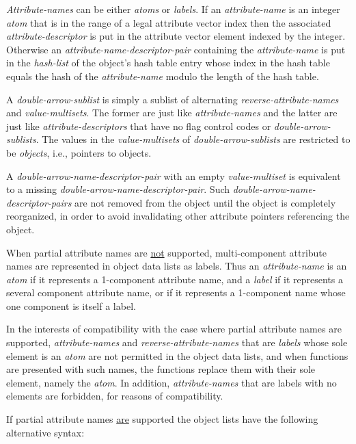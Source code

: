 \documentclass[12pt]{article}
\begin{document}
{\em Attribute-names} can be either {\em atoms} or {\em labels}.
If an {\em attribute-name} is an integer {\em atom}
that is in the range of a legal
attribute vector index then the associated
{\em attribute-descriptor} is put in the attribute vector element
indexed by the integer.
Otherwise an {\em attribute-name-descriptor-pair} containing
the {\em attribute-name} is put
in the {\em hash-list} of the object's hash table entry whose index
in the hash table
equals the hash of the {\em attribute-name} modulo the length of the
hash table.

A {\em double-arrow-sublist} is 
simply a sublist of alternating {\em reverse-attribute-names}
and {\em value-multisets}.  The former are just like {\em attribute-names}
and the latter are just like {\em attribute-descriptors} that have no
flag control codes or {\em double-arrow-sublists}.
The values in the {\em value-multisets} of {\em double-arrow-sublists}
are restricted to be {\em objects}, i.e., pointers to objects.

A {\em double-arrow-name-descriptor-pair} with an empty {\em value-multiset}
is equivalent to a missing {\em double-arrow-name-descriptor-pair}.
Such {\em dou\-ble-arrow-name-descriptor-pairs} are not
removed from the object until the object is completely reorganized,
in order to avoid invalidating other attribute pointers referencing the object.

When partial attribute names are \underline{not} supported, multi-component
attribute names are represented in object data lists as labels.
Thus an {\em attribute-name} is an {\em atom} if it represents a 1-component
attribute name, and a {\em label} if it represents a several component
attribute name, or if it represents a 1-component name whose one component
is itself a label.

In the interests of compatibility with the case where partial attribute
names are supported, {\em attribute-names} and {\em reverse-attribute-names}
that are {\em labels} whose sole element is an {\em atom} are not
permitted in the object data lists, and when functions are presented with
such names, the functions replace them with their sole element, namely the
{\em atom}.  In addition, {\em attribute-names} that are labels with no elements
are forbidden, for reasons of compatibility.

If partial attribute names \underline{are} supported
the object lists have the following alternative syntax:
\end{document}
